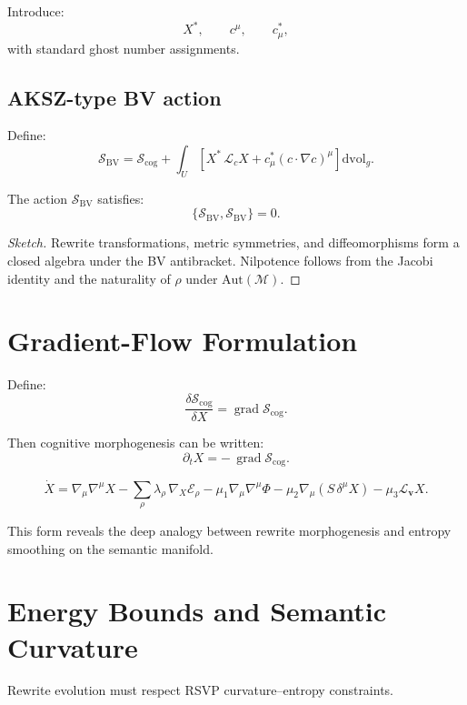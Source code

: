 Introduce:
\[
X^*,\qquad c^\mu,\qquad c_\mu^*,
\]
with standard ghost number assignments.

\subsection{AKSZ-type BV action}

Define:
\[
\mathcal{S}_{\mathrm{BV}}
=
\mathcal{S}_{\mathrm{cog}}
+
\int_U
\left[
X^*\,\mathcal{L}_c X
+
c_\mu^*(c\cdot\nabla c)^\mu
\right]\mathrm{dvol}_g.
\]

\begin{proposition}
The action $\mathcal{S}_{\mathrm{BV}}$ satisfies:
\[
\{\mathcal{S}_{\mathrm{BV}}, \mathcal{S}_{\mathrm{BV}}\}=0.
\]
\end{proposition}

\begin{proof}[Sketch]
Rewrite transformations, metric symmetries, and diffeomorphisms form a closed
algebra under the BV antibracket. Nilpotence follows from the Jacobi identity
and the naturality of $\rho$ under $\mathrm{Aut}(\mathcal{M})$.
\end{proof}

\section{Gradient-Flow Formulation}

Define:
\[
\frac{\delta \mathcal{S}_{\mathrm{cog}}}{\delta X}
=
\operatorname{grad}\mathcal{S}_{\mathrm{cog}}.
\]

Then cognitive morphogenesis can be written:
\[
\partial_t X = -\,\operatorname{grad}\mathcal{S}_{\mathrm{cog}}.
\]

\begin{definition}
\[
\dot{X}
=
\nabla_\mu \nabla^\mu X
-
\sum_{\rho}\lambda_\rho\,\nabla_X\mathcal{E}_\rho
-
\mu_1\nabla_\mu\nabla^\mu\Phi
-
\mu_2\nabla_\mu(S\,\delta^\mu X)
-
\mu_3\mathcal{L}_{\mathbf{v}}X.
\]
\end{definition}

This form reveals the deep analogy between rewrite morphogenesis and entropy
smoothing on the semantic manifold.

\section{Energy Bounds and Semantic Curvature}

Rewrite evolution must respect RSVP curvature--entropy constraints.

